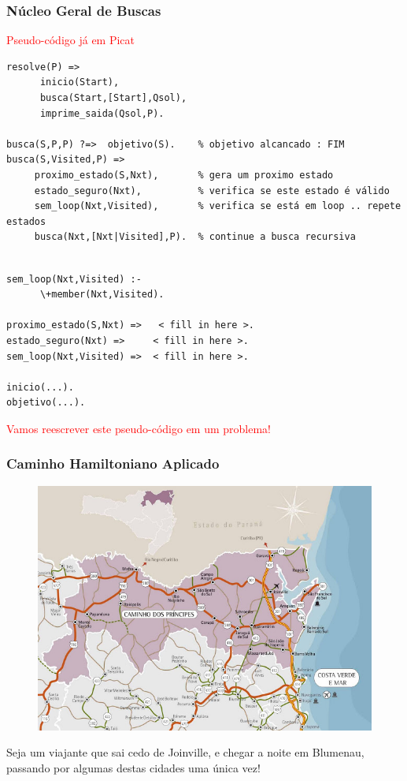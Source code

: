 \begin{frame}[fragile, allowframebreaks=0.9]
  \frametitle{Núcleo Geral de Buscas}

\textcolor{red}{Pseudo-código já em Picat}

\begin{verbatim}
resolve(P) =>
      inicio(Start),
      busca(Start,[Start],Qsol),
      imprime_saida(Qsol,P).

busca(S,P,P) ?=>  objetivo(S).    % objetivo alcancado : FIM    
busca(S,Visited,P) =>
     proximo_estado(S,Nxt),       % gera um proximo estado  
     estado_seguro(Nxt),          % verifica se este estado é válido 
     sem_loop(Nxt,Visited),       % verifica se está em loop .. repete estados 
     busca(Nxt,[Nxt|Visited],P).  % continue a busca recursiva 
\end{verbatim}


\framebreak


\begin{verbatim}

sem_loop(Nxt,Visited) :-
      \+member(Nxt,Visited).

proximo_estado(S,Nxt) =>   < fill in here >.
estado_seguro(Nxt) =>     < fill in here >.
sem_loop(Nxt,Visited) =>  < fill in here >.     
                       
inicio(...).
objetivo(...).

\end{verbatim}


\textcolor{red}{Vamos reescrever este pseudo-código em um problema!}


\end{frame}


\begin{frame}[fragile]
\frametitle{Caminho Hamiltoniano Aplicado}

\begin{figure}[!htb]
\centering
\includegraphics[width=.8\textwidth, height=0.567\textheight]{figures/mapa-norte-santa-catarina.jpg}
\end{figure}

Seja um viajante que sai cedo de Joinville, e chegar a noite
em Blumenau, passando por algumas destas cidades uma única vez!

\end{frame}


